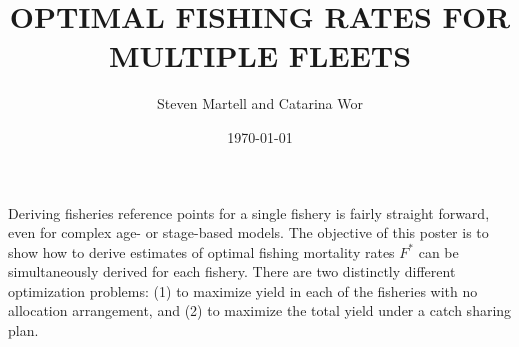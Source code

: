 \documentclass[20pt, a0paper, landscape]{tikzposter}
\title{OPTIMAL FISHING RATES FOR MULTIPLE FLEETS}
\author{Steven Martell and Catarina Wor}
\date{\today}
\institute{INTERNATIONAL PACIFIC HALIBUT COMMISSION}
\begin{document}
 
\maketitle
 
{
	Deriving fisheries reference points for a single fishery is fairly straight forward, even for complex age- or stage-based models.  The objective of this poster is to show how to derive estimates of optimal fishing mortality rates $F^*$ can be simultaneously derived for each fishery.  There are two distinctly different optimization problems: (1) to maximize yield in each of the fisheries with no allocation arrangement, and (2) to maximize the total yield under a catch sharing plan.
}

 
        

\end{document}
